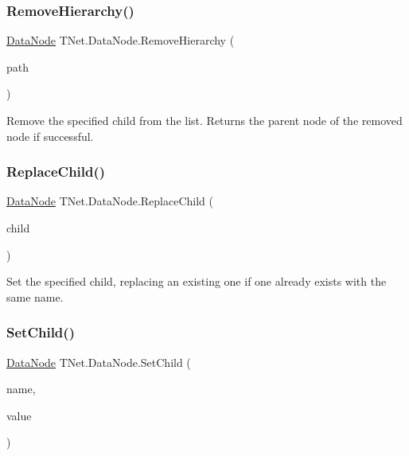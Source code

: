 \subsubsection{\texorpdfstring{Remove\+Hierarchy()}{RemoveHierarchy()}}
{\footnotesize\ttfamily \mbox{\hyperlink{class_t_net_1_1_data_node}{Data\+Node}} T\+Net.\+Data\+Node.\+Remove\+Hierarchy (\begin{DoxyParamCaption}\item[{string}]{path }\end{DoxyParamCaption})}



Remove the specified child from the list. Returns the parent node of the removed node if successful. 

\mbox{\label{class_t_net_1_1_data_node_ae0cc7801b9ce856d64025fd5fd758e6b}} 
\subsubsection{\texorpdfstring{Replace\+Child()}{ReplaceChild()}}
{\footnotesize\ttfamily \mbox{\hyperlink{class_t_net_1_1_data_node}{Data\+Node}} T\+Net.\+Data\+Node.\+Replace\+Child (\begin{DoxyParamCaption}\item[{\mbox{\hyperlink{class_t_net_1_1_data_node}{Data\+Node}}}]{child }\end{DoxyParamCaption})}



Set the specified child, replacing an existing one if one already exists with the same name. 

\mbox{\label{class_t_net_1_1_data_node_a952008873fb2317d354d1eb5e5ef66e4}} 
\subsubsection{\texorpdfstring{Set\+Child()}{SetChild()}}
{\footnotesize\ttfamily \mbox{\hyperlink{class_t_net_1_1_data_node}{Data\+Node}} T\+Net.\+Data\+Node.\+Set\+Child (\begin{DoxyParamCaption}\item[{string}]{name,  }\item[{object}]{value }\end{DoxyParamCaption})}



